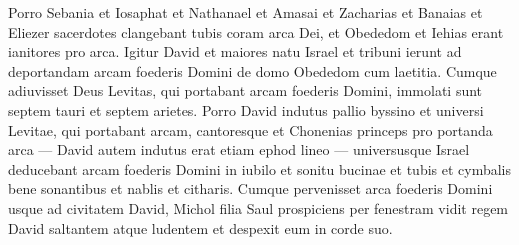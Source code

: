 \begin{biblechapter}
\verse Porro Sebania et Iosaphat et Nathanael et Amasai et Zacharias et Banaias et Eliezer sacerdotes clangebant tubis coram arca Dei, et Obededom et Iehias erant ianitores pro arca. 
\verse Igitur David et maiores natu Israel et tribuni ierunt ad deportandam arcam foederis Domini de domo Obededom cum laetitia. 
\verse Cumque adiuvisset Deus Levitas, qui portabant arcam foederis Domini, immolati sunt septem tauri et septem arietes. 
\verse Porro David indutus pallio byssino et universi Levitae, qui portabant arcam, cantoresque et Chonenias princeps pro portanda arca — David autem indutus erat etiam ephod lineo — 
\verse universusque Israel deducebant arcam foederis Domini in iubilo et sonitu bucinae et tubis et cymbalis bene sonantibus et nablis et citharis. 
\verse Cumque pervenisset arca foederis Domini usque ad civitatem David, Michol filia Saul prospiciens per fenestram vidit regem David saltantem atque ludentem et despexit eum in corde suo. 
\end{biblechapter}


